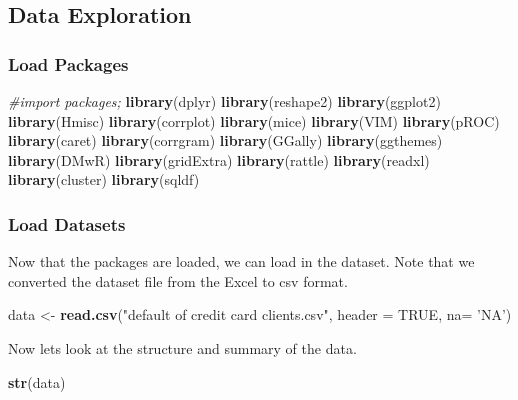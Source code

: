 \documentclass[]{article}
\newenvironment{Shaded}{\begin{snugshade}}{\end{snugshade}}
\newcommand{\KeywordTok}[1]{\textcolor[rgb]{0.13,0.29,0.53}{\textbf{#1}}}
\newcommand{\DataTypeTok}[1]{\textcolor[rgb]{0.13,0.29,0.53}{#1}}
\newcommand{\StringTok}[1]{\textcolor[rgb]{0.31,0.60,0.02}{#1}}
\newcommand{\CommentTok}[1]{\textcolor[rgb]{0.56,0.35,0.01}{\textit{#1}}}
\newcommand{\OtherTok}[1]{\textcolor[rgb]{0.56,0.35,0.01}{#1}}
\newcommand{\NormalTok}[1]{#1}
\begin{document}
\subsection{Data Exploration}\label{data-exploration}

\subsubsection{Load Packages}\label{load-packages}

\begin{Shaded}
\begin{Highlighting}[]
\CommentTok{#import packages;}
\KeywordTok{library}\NormalTok{(dplyr)}
\KeywordTok{library}\NormalTok{(reshape2)}
\KeywordTok{library}\NormalTok{(ggplot2)}
\KeywordTok{library}\NormalTok{(Hmisc)}
\KeywordTok{library}\NormalTok{(corrplot)}
\KeywordTok{library}\NormalTok{(mice)}
\KeywordTok{library}\NormalTok{(VIM)}
\KeywordTok{library}\NormalTok{(pROC)}
\KeywordTok{library}\NormalTok{(caret)}
\KeywordTok{library}\NormalTok{(corrgram)}
\KeywordTok{library}\NormalTok{(GGally)}
\KeywordTok{library}\NormalTok{(ggthemes) }
\KeywordTok{library}\NormalTok{(DMwR)}
\KeywordTok{library}\NormalTok{(gridExtra)}
\KeywordTok{library}\NormalTok{(rattle)}
\KeywordTok{library}\NormalTok{(readxl)}
\KeywordTok{library}\NormalTok{(cluster)}
\KeywordTok{library}\NormalTok{(sqldf)}
\end{Highlighting}
\end{Shaded}

\subsubsection{Load Datasets}\label{load-datasets}

Now that the packages are loaded, we can load in the dataset. Note that
we converted the dataset file from the Excel to csv format.

\begin{Shaded}
\begin{Highlighting}[]
\NormalTok{data <-}\StringTok{ }\KeywordTok{read.csv}\NormalTok{(}\StringTok{"default of credit card clients.csv"}\NormalTok{, }\DataTypeTok{header =} \OtherTok{TRUE}\NormalTok{, }\DataTypeTok{na=} \StringTok{'NA'}\NormalTok{)}
\end{Highlighting}
\end{Shaded}

Now lets look at the structure and summary of the data.

\begin{Shaded}
\begin{Highlighting}[]
\KeywordTok{str}\NormalTok{(data)}
\end{Highlighting}
\end{Shaded}
\end{document}
